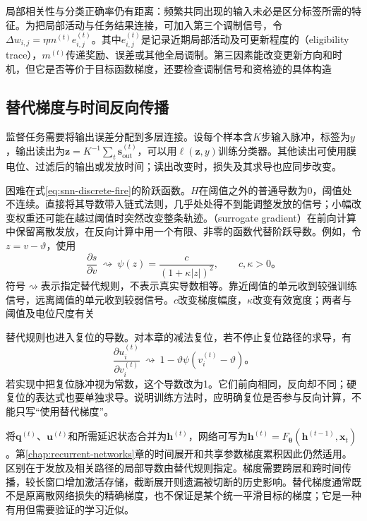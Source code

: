局部相关性与分类正确率仍有距离：频繁共同出现的输入未必是区分标签所需的特征。为把局部活动与任务结果连接，可加入第三个调制信号，令$\Delta w_{i,j}=\eta m^{(t)}e_{i,j}^{(t)}$。其中$e_{i,j}^{(t)}$是记录近期局部活动及可更新程度的（eligibility trace），$m^{(t)}$传递奖励、误差或其他全局调制。第三因素能改变更新方向和时机，但它是否等价于目标函数梯度，还要检查调制信号和资格迹的具体构造

\subsection{替代梯度与时间反向传播}
\label{sec:snn-surrogate}

监督任务需要将输出误差分配到多层连接。设每个样本含$K$步输入脉冲，标签为$y$，输出读出为$\bm z=K^{-1}\sum_t\bm s_{\mathrm{out}}^{(t)}$，可以用$\ell(\bm z,y)$训练分类器。其他读出可使用膜电位、过滤后的输出或发放时间；读出改变时，损失及其求导也应同步改变。

困难在式\eqref{eq:snn-discrete-fire}的阶跃函数。$H$在阈值之外的普通导数为0，阈值处不连续。直接将其导数带入链式法则，几乎处处得不到能调整发放的信号；小幅改变权重还可能在越过阈值时突然改变整条轨迹。（surrogate gradient）在前向计算中保留离散发放，在反向计算中用一个有限、非零的函数代替阶跃导数。例如，令$z=v-\vartheta$，使用
\begin{equation}
  \frac{\partial s}{\partial v}\ \rightsquigarrow\
  \psi(z)=\frac{c}{(1+\kappa|z|)^2},\qquad c,\kappa>0\text{。}
  \label{eq:snn-surrogate-derivative}
\end{equation}
符号$\rightsquigarrow$表示指定替代规则，不表示真实导数相等。靠近阈值的单元收到较强训练信号，远离阈值的单元收到较弱信号。$c$改变梯度幅度，$\kappa$改变有效宽度；两者与阈值及电位尺度有关

替代规则也进入复位的导数。对本章的减法复位，若不停止复位路径的求导，有
\begin{equation}
  \frac{\partial u_i^{(t)}}{\partial v_i^{(t)}}
  \ \rightsquigarrow\ 1-\vartheta\psi(v_i^{(t)}-\vartheta)\text{。}
  \label{eq:snn-reset-gradient}
\end{equation}
若实现中把复位脉冲视为常数，这个导数改为1。它们前向相同，反向却不同；硬复位的表达式也要单独求导。说明训练方法时，应明确复位是否参与反向计算，不能只写“使用替代梯度”。

将$\bm q^{(t)}$、$\bm u^{(t)}$和所需延迟状态合并为$\bm h^{(t)}$，网络可写为$\bm h^{(t)}=F_{\bm\theta}(\bm h^{(t-1)},\bm x_t)$。第\ref{chap:recurrent-networks}章的时间展开和共享参数梯度累积因此仍然适用。区别在于发放及相关路径的局部导数由替代规则指定。梯度需要跨层和跨时间传播，较长窗口增加激活存储，截断展开则遗漏被切断的历史影响。替代梯度通常既不是原离散网络损失的精确梯度，也不保证是某个统一平滑目标的梯度；它是一种有用但需要验证的学习近似。

